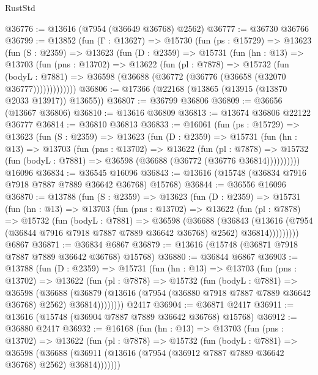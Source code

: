 \begin{lexlean}{RustStd}
\begin{coremodule}
@36776 := @13616 (@7954 (@36649 @36768) @2562)
@36777 := @36730 @36766
@36799 := @13852
    (fun (Γ : @13627) =>
    @15730
      (fun (ps : @15729) =>
      @13623
        (fun (S : @2359) =>
        @13623
          (fun (D : @2359) =>
          @15731
            (fun (hn : @13) =>
            @13703
              (fun (pns : @13702) =>
              @13622
                (fun (pl : @7878) =>
                @15732
                  (fun (bodyL : @7881) =>
                  @36598 (@36688 (@36772 (@36776 (@36658 (@32070 @36777)))))))))))))
@36806 := @17366 (@22168 (@13865 (@13915 (@13870 @2033 @13917)) @13655))
@36807 := @36799 @36806
@36809 := @36656 (@13667 @36806)
@36810 := @13616 @36809
@36813 := @13674 @36806 @22122 @36777
@36814 := @36810 @36813
@36833 := @16061
    (fun (ps : @15729) =>
    @13623
      (fun (S : @2359) =>
      @13623
        (fun (D : @2359) =>
        @15731
          (fun (hn : @13) =>
          @13703
            (fun (pns : @13702) =>
            @13622
              (fun (pl : @7878) =>
              @15732 (fun (bodyL : @7881) => @36598 (@36688 (@36772 (@36776 @36814))))))))))
    @16096
@36834 := @36545 @16096
@36843 := @13616 (@15748 (@36834 @7916 @7918 @7887 @7889 @36642 @36768) @15768)
@36844 := @36556 @16096
@36870 := @13788
    (fun (S : @2359) =>
    @13623
      (fun (D : @2359) =>
      @15731
        (fun (hn : @13) =>
        @13703
          (fun (pns : @13702) =>
          @13622
            (fun (pl : @7878) =>
            @15732
              (fun (bodyL : @7881) =>
              @36598
                (@36688
                  (@36843
                    (@13616
                      (@7954 (@36844 @7916 @7918 @7887 @7889 @36642 @36768) @2562)
                      @36814)))))))))
    @6867
@36871 := @36834 @6867
@36879 := @13616 (@15748 (@36871 @7918 @7887 @7889 @36642 @36768) @15768)
@36880 := @36844 @6867
@36903 := @13788
    (fun (D : @2359) =>
    @15731
      (fun (hn : @13) =>
      @13703
        (fun (pns : @13702) =>
        @13622
          (fun (pl : @7878) =>
          @15732
            (fun (bodyL : @7881) =>
            @36598
              (@36688
                (@36879
                  (@13616 (@7954 (@36880 @7918 @7887 @7889 @36642 @36768) @2562) @36814))))))))
    @2417
@36904 := @36871 @2417
@36911 := @13616 (@15748 (@36904 @7887 @7889 @36642 @36768) @15768)
@36912 := @36880 @2417
@36932 := @16168
    (fun (hn : @13) =>
    @13703
      (fun (pns : @13702) =>
      @13622
        (fun (pl : @7878) =>
        @15732
          (fun (bodyL : @7881) =>
          @36598
            (@36688 (@36911 (@13616 (@7954 (@36912 @7887 @7889 @36642 @36768) @2562) @36814)))))))

\end{coremodule}
\end{lexlean}

